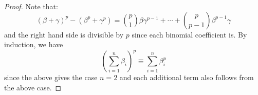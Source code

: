 \begin{proof}
    Note that:
    \[ (\beta+\gamma)^p - (\beta^p+\gamma^p) = {p \choose 1}\beta\gamma^{p-1} + \cdots + {p \choose p-1}\beta^{p-1}\gamma \]
    and the right hand side is divisible by $p$ since each binomial coefficient is. By induction, we have
    \[ \left(\sum_{i=1}^n \beta_i\right)^p \equiv \sum_{i=1}^n \beta_i^p \]
    since the above gives the case $n=2$ and each additional term also follows from the above case.
\end{proof}